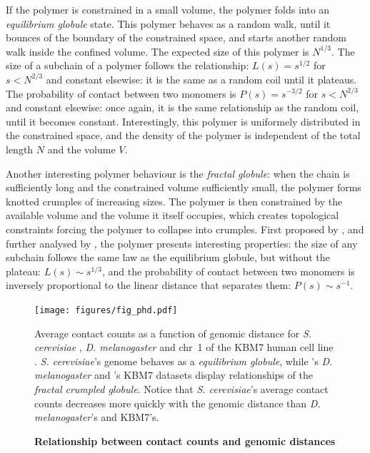 If the polymer is constrained in a small volume, the polymer folds into an
\textit{equilibrium globule} state. This polymer behaves as a random walk,
until it bounces of the boundary of the constrained space, and starts another
random walk inside the confined volume. The expected size of this polymer is
$N^{1/3}$. The size of a subchain of a polymer follows the relationship: $L(s) =
s^{1/2}$ for $s < N^{2/3}$ and constant elsewise: it is the same as a random
coil until it plateaus. The probability of contact between two monomers is
$P(s) = s^{-3/2}$ for $s < N^{2/3}$ and constant elsewise: once again, it is
the same relationship as the random coil, until it becomes constant.
Interestingly, this polymer is uniformely distributed in the constrained
space, and the density of the polymer is independent of the total length $N$
and the volume $V$.

Another interesting polymer behaviour is the \textit{fractal globule}: when
the chain is sufficiently long and the constrained volume sufficiently small,
the polymer forms knotted crumples of increasing sizes. The polymer is then
constrained by the available volume and the volume it itself occupies, which
creates topological constraints forcing the polymer to collapse into crumples.
First proposed by \citet{grosberg:role}, and further analysed by
\citet{mirny:fractal}, the polymer presents interesting properties: the size
of any subchain follows the same law as the equilibrium globule, but without
the plateau: $L(s) \sim s^{1/3}$, and the probability of contact between two
monomers is inversely proportional to the linear distance that separates them:
$P(s) \sim s^{-1}$.


\begin{figure}
\begin{center}
\texttt{[image: figures/fig\_phd.pdf]}
\end{center}
\caption{{\bf Relationship between contact counts and genomic distances}}{
Average contact counts as a function of genomic distance for \textit{S.
cerevisiae} \citep{duan:three-dimensional},
\textit{D. melanogaster} \citep{sexton:three-dimensional} and chr~1 of the
KBM7 human cell line \citep{rao:3d}. \textit{S. cerevisiae}'s genome behaves
as a \textit{equilibrium globule},
while \citet{sexton:three-dimensional}'s \textit{D.
melanogaster} and \citet{rao:3d}'s KBM7 datasets display relationships of the
\textit{fractal crumpled globule}. Notice that \textit{S. cerevisiae}'s
average contact counts decreases more quickly with the genomic distance than
\textit{D. melanogaster}'s and KBM7's.
}
\label{fig:hic_relationships}
\end{figure}

